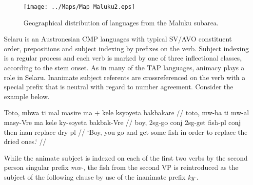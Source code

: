 \begin{figure}
\begin{center}
\texttt{[image: ../Maps/Map\_Maluku2.eps]}
\caption{Geographical distribution of languages from the Maluku subarea.}\label{map:Mal}
\end{center}
\end{figure}

Selaru is an Austronesian CMP languages with typical SV/AVO constituent order, prepositions and subject indexing by prefixes on the verb. Subject indexing is a regular process and each verb is marked by one of three inflectional classes, according to the stem onset. As in many of the TAP languages, animacy plays a role in Selaru. Inanimate subject referents are crossreferenced on the verb with a special prefix that is neutral with regard to number agreement. Consider the example below.

\ex \label{selaru1}
\begingl[glhangstyle=none]
\gla Toto, mbwa ti mal masire ma + kele ksyoyeta bakbakare // 
\glb toto, mw-ba ti mw-al masy-Vre ma kele ky-soyeta bakbak-Vre //
\glc boy, \acs{2}\acs{sg}-go \acs{conj} \acs{2}\acs{sg}-get fish-\acs{pl} \acs{conj} then \acs{inan}-replace dry-\acs{pl} //
\glft `Boy, you go and get some fish in order to replace the dried ones.‘ // 
\endgl
\xe

While the animate subject is indexed on each of the first two verbs by the second person singular prefix \textit{mw-}, the fish from the second VP is reintroduced as the subject of the following clause by use of the inanimate prefix \textit{ky-}. 

